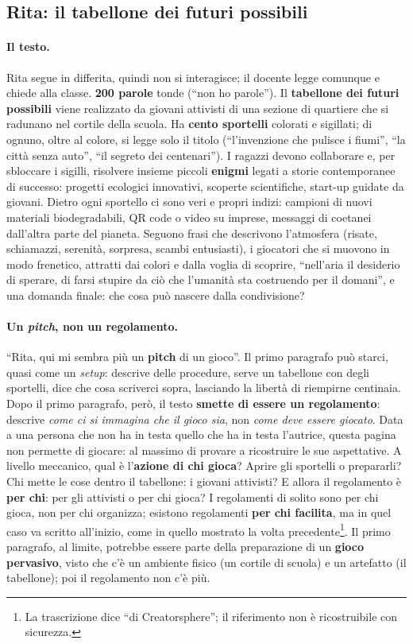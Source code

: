 \subsection{Rita: il tabellone dei futuri possibili}
\label{a6:sec:rita}

\paragraph{Il testo.} Rita segue in differita, quindi non si interagisce; il docente
legge comunque e chiede alla classe. \textbf{200 parole} tonde (``non ho parole''). Il
\textbf{tabellone dei futuri possibili} viene realizzato da giovani attivisti di una
sezione di quartiere che si radunano nel cortile della scuola. Ha \textbf{cento
sportelli} colorati e sigillati; di ognuno, oltre al colore, si legge solo il titolo
(``l'invenzione che pulisce i fiumi'', ``la città senza auto'', ``il segreto dei
centenari''). I ragazzi devono collaborare e, per sbloccare i sigilli, risolvere
insieme piccoli \textbf{enigmi} legati a storie contemporanee di successo: progetti
ecologici innovativi, scoperte scientifiche, start-up guidate da giovani. Dietro ogni
sportello ci sono veri e propri indizi: campioni di nuovi materiali biodegradabili, QR
code o video su imprese, messaggi di coetanei dall'altra parte del pianeta. Seguono
frasi che descrivono l'atmosfera (risate, schiamazzi, serenità, sorpresa, scambi
entusiasti), i giocatori che si muovono in modo frenetico, attratti dai colori e dalla
voglia di scoprire, ``nell'aria il desiderio di sperare, di farsi stupire da ciò che
l'umanità sta costruendo per il domani'', e una domanda finale: che cosa può nascere
dalla condivisione?

\paragraph{Un \emph{pitch}, non un regolamento.} ``Rita, qui mi sembra più un
\textbf{pitch} di un gioco''. Il primo paragrafo può starci, quasi come un
\emph{setup}: descrive delle procedure, serve un tabellone con degli sportelli, dice
che cosa scriverci sopra, lasciando la libertà di riempirne centinaia. Dopo il primo
paragrafo, però, il testo \textbf{smette di essere un regolamento}: descrive
\emph{come ci si immagina che il gioco sia}, non \emph{come deve essere giocato}. Data
a una persona che non ha in testa quello che ha in testa l'autrice, questa pagina non
permette di giocare: al massimo di provare a ricostruire le sue aspettative. A livello
meccanico, qual è l'\textbf{azione di chi gioca}? Aprire gli sportelli o prepararli?
Chi mette le cose dentro il tabellone: i giovani attivisti? E allora il regolamento è
\textbf{per chi}: per gli attivisti o per chi gioca? I regolamenti di solito sono per
chi gioca, non per chi organizza; esistono regolamenti \textbf{per chi facilita}, ma in
quel caso va scritto all'inizio, come in quello mostrato la volta
precedente\footnote{La trascrizione dice ``di Creatorsphere''; il riferimento non è
ricostruibile con sicurezza.}. Il primo paragrafo, al limite, potrebbe essere parte
della preparazione di un \textbf{gioco pervasivo}, visto che c'è un ambiente fisico
(un cortile di scuola) e un artefatto (il tabellone); poi il regolamento non c'è più.

